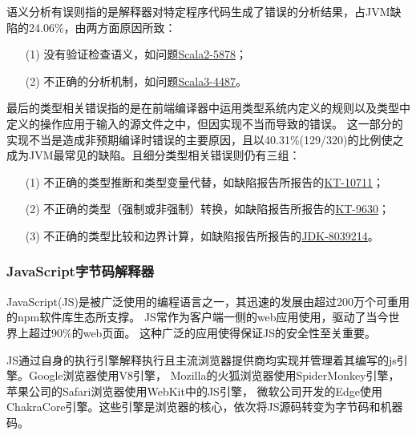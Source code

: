 		语义分析有误则指的是解释器对特定程序代码生成了错误的分析结果，占JVM缺陷的24.06\%，由两方面原因所致：
		\begin{itemize}
			\item [(1)] 没有验证检查语义，如问题\href{https://github.com/scala/bug/issues/5878}{Scala2-5878}；
			\item [(2)] 不正确的分析机制，如问题\href{https://github.com/scala/scala3/pull/4487}{Scala3-4487}。 
		\end{itemize}

		最后的类型相关错误指的是在前端编译器中运用类型系统内定义的规则以及类型中定义的操作应用于输入的源文件之中，但因实现不当而导致的错误。
		这一部分的实现不当是造成非预期编译时错误的主要原因，且以40.31\%(129/320)的比例使之成为JVM最常见的缺陷。且细分类型相关错误则仍有三组：
		\begin{itemize}
			\item [(1)] 不正确的类型推断和类型变量代替，如缺陷报告所报告的\href{https://youtrack.jetbrains.com/issue/KT-10711}{KT-10711}；
			\item [(2)] 不正确的类型（强制或非强制）转换，如缺陷报告所报告的\href{https://youtrack.jetbrains.com/issue/KT-9630}{KT-9630}；
			\item [(3)] 不正确的类型比较和边界计算，如缺陷报告所报告的\href{https://bugs.openjdk.org/browse/JDK-8284879}{JDK-8039214}。
		\end{itemize}

		\subsubsection{JavaScript字节码解释器}
		JavaScript(JS)是被广泛使用的编程语言之一，其迅速的发展由超过200万个可重用的npm软件库生态所支撑\cite{bhuiyanSecBenchjsExecutableSecurity2023}。
		JS常作为客户端一侧的web应用使用，驱动了当今世界上超过90\%的web页面\cite{Staicu2018SYNODEUA}。
		这种广泛的应用使得保证JS的安全性至关重要\cite{eomFuzzingJavaScriptInterpreters2024}。

		JS通过自身的执行引擎解释执行且主流浏览器提供商均实现并管理着其编写的js引擎。Google浏览器使用V8引擎，
		Mozilla的火狐浏览器使用SpiderMonkey引擎，苹果公司的Safari浏览器使用WebKit中的JS引擎，
		微软公司开发的Edge使用ChakraCore引擎。这些引擎是浏览器的核心\cite{limSOKAnalysisWeb2021}，依次将JS源码转变为字节码和机器码。

